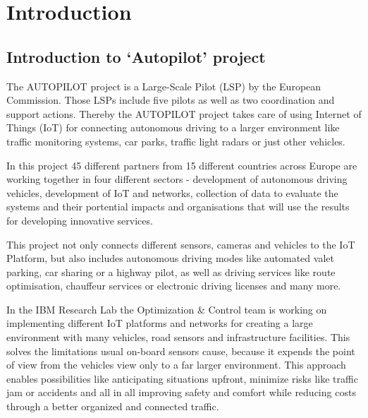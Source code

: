 
\chapter{Introduction}

\section{Introduction to `Autopilot' project}

The AUTOPILOT project is a Large-Scale Pilot (LSP) by the European Commission. Those LSPs include five pilots as well as two coordination and support actions. Thereby the AUTOPILOT project takes care of using Internet of Things (IoT) for connecting autonomous driving to a larger environment like traffic monitoring systems, car parks, traffic light radars or just other vehicles.


In this project 45 different partners from 15 different countries across Europe are working together in four different sectors - development of autonomous driving vehicles, development of IoT and networks, collection of data to evaluate the systems and their portential impacts and organisations that will use the results for developing innovative services.


This project not only connects different sensors, cameras and vehicles to the IoT Platform, but also includes autonomous driving modes like automated valet parking, car sharing or a highway pilot, as well as driving services like route optimisation, chauffeur services or electronic driving licenses and many more.


In the IBM Research Lab the Optimization \& Control team is working on implementing different IoT platforms and networks for creating a large environment with many vehicles, road sensors and infrastructure facilities. This solves the limitations usual on-board sensors cause, because it expends the point of view from the vehicles view only to a far larger environment. This approach enables possibilities like anticipating situations upfront, minimize risks like traffic jam or accidents and all in all improving safety and comfort while reducing costs through a better organized and connected traffic.

